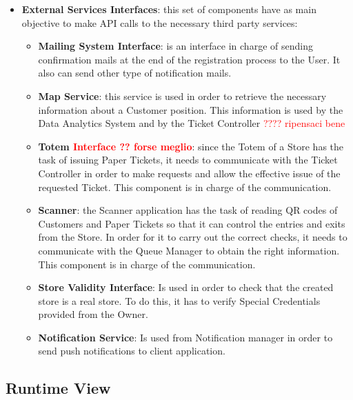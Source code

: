 \documentclass[a4paper, 12pt, oneside, table]{article}
\newcommand{\yasmin}[1]{\textcolor{Red}{#1}}
\begin{document}
\begin{itemize}
\begin{itemize}
    \end{itemize}
    \item \textbf{External Services Interfaces}: this set of components have as main objective to make API calls to the necessary third party services:
    \begin{itemize}
        \item \textbf{Mailing System Interface}: is an interface in charge of sending confirmation mails at the end of the registration process to the User. It also can send other type of notification mails.
        \item \textbf{Map Service}: this service is used in order to retrieve the necessary information about a Customer position. This information is used by the Data Analytics System and by the Ticket Controller \yasmin{???? ripensaci bene}
        \item \textbf{Totem \yasmin{Interface ?? forse meglio}}: since the Totem of a Store has the task of issuing Paper Tickets, it needs to communicate with the Ticket Controller in order to make requests and allow the effective issue of the requested Ticket. This component is in charge of the communication.
        \item \textbf{Scanner}: the Scanner application has the task of reading QR codes of Customers and Paper Tickets so that it can control the entries and exits from the Store. In order for it to carry out the correct checks, it needs to communicate with the Queue Manager to obtain the right information. This component is in charge of the communication.
        \item \textbf{Store Validity Interface}: Is used in order to check that the created store is a real store. To do this, it has to verify Special Credentials provided from the Owner.
        
        \item \textbf{Notification Service}: Is used from Notification manager in order to send push notifications to client application.
    \end{itemize}
    
\end{itemize}

\subsection{Runtime View}
\end{document}
